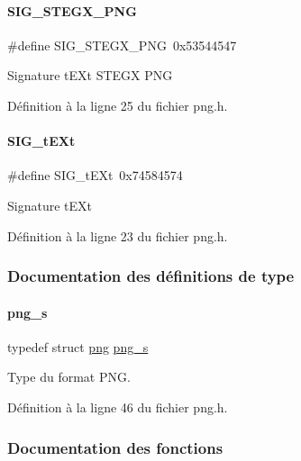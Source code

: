 \paragraph{\texorpdfstring{S\+I\+G\+\_\+\+S\+T\+E\+G\+X\+\_\+\+P\+NG}{SIG\_STEGX\_PNG}}
{\footnotesize\ttfamily \#define S\+I\+G\+\_\+\+S\+T\+E\+G\+X\+\_\+\+P\+NG~0x53544547}

Signature t\+E\+Xt S\+T\+E\+GX P\+NG 

Définition à la ligne 25 du fichier png.\+h.

\mbox{\label{a00095_a62c1ea4563bb6718526bdc2cdc652b5c}} 
\paragraph{\texorpdfstring{S\+I\+G\+\_\+t\+E\+Xt}{SIG\_tEXt}}
{\footnotesize\ttfamily \#define S\+I\+G\+\_\+t\+E\+Xt~0x74584574}

Signature t\+E\+Xt 

Définition à la ligne 23 du fichier png.\+h.



\subsubsection{Documentation des définitions de type}
\mbox{\label{a00095_a714e5dc9c1149c3bec03347018bdecc7}} 
\paragraph{\texorpdfstring{png\+\_\+s}{png\_s}}
{\footnotesize\ttfamily typedef struct \hyperlink{a00174}{png} \hyperlink{a00095_a714e5dc9c1149c3bec03347018bdecc7}{png\+\_\+s}}

Type du format P\+NG. 

Définition à la ligne 46 du fichier png.\+h.



\subsubsection{Documentation des fonctions}
\mbox{\label{a00095_a258c2aefc0d29e112eca90e652730a84}} 
